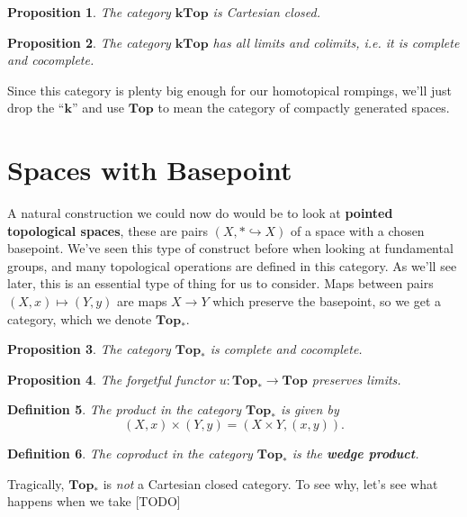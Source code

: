 \documentclass[12pt]{article}
\newtheorem{definition}{Definition}[subsection]
\newtheorem{proposition}[definition]{Proposition}
\begin{document}
\begin{proposition}
  The category $\mathbf{kTop}$ is Cartesian closed.
\end{proposition}

\begin{proposition}
  The category $\mathbf{kTop}$ has all limits and colimits, i.e. it is complete and cocomplete.
\end{proposition}

Since this category is plenty big enough for our homotopical rompings, we'll just drop the ``$\textbf{k}$'' and use $\textbf{Top}$ to mean the category of compactly generated spaces.

\section{Spaces with Basepoint}

A natural construction we could now do would be to look at \textbf{pointed topological spaces}, these are pairs $(X, * \hookrightarrow X)$ of a space with a chosen basepoint. We've seen this type of construct before when looking at fundamental groups, and many topological operations are defined in this category. As we'll see later, this is an essential type of thing for us to consider. Maps between pairs $(X, x) \mapsto (Y, y)$ are maps $X \to Y$ which preserve the basepoint, so we get a category, which we denote $\mathbf{Top}_*$.

\begin{proposition}
  The category $\mathbf{Top}_*$ is complete and cocomplete.
\end{proposition}

\begin{proposition}
  The forgetful functor $u : \mathbf{Top}_* \to \mathbf{Top}$ preserves limits.
\end{proposition}

\begin{definition}
  The product in the category $\mathbf{Top}_*$ is given by
  \[(X, x)\times (Y, y) = (X\times Y, (x,y)).\]
\end{definition}

\begin{definition}
  The coproduct in the category $\mathbf{Top}_*$ is the \textbf{wedge product}. 
\end{definition}

Tragically, $\mathbf{Top}_*$ is \emph{not} a Cartesian closed category. To see why, let's see what happens when we take [TODO]
\end{document}
